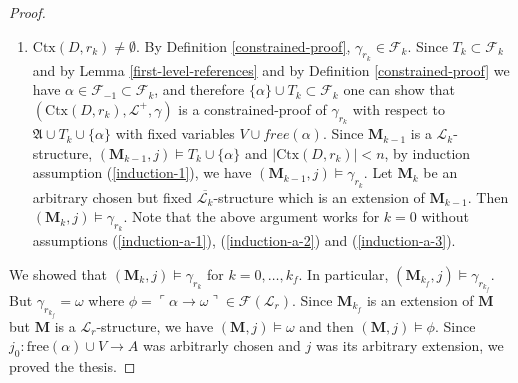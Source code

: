 \documentclass[10pt]{article}
\theoremstyle{plain}
\newcommand{\free}{\text{free}}
\newcommand{\sk}{\mathfrak{s}}
\newcommand{\F}{\mathcal{F}}
\newcommand{\context}{\text{Ctx}}
\renewcommand{\L}{\mathscr{L}}
\newcommand{\M}{\mathbf{M}}
\begin{document}
\begin{proof}
\begin{enumerate}
\begin{enumerate}
$$
\beta^{\M_{k-1}}\bigg((\sk^m_{r_k})^{\M_{k}}(j(x_1), \dots, j(x_n)), j(x_1), \dots, j(x_n), j_0(y_1), \dots, j_0(y_m)\bigg).
$$

Since $j$ is an extension of $j_0$, we have:

$$
\beta^{\M_{k-1}}\bigg((\sk^m_{r_k})^{\M_{k}}(j(x_1), \dots, j(x_n)), j(x_1), \dots, j(x_n), j(y_1), \dots, j(y_m)\bigg).
$$

Therefore $(\M_k, j\cfrac{(\sk^m_{r_k})^{(\M_{k}, j)}}{x})\models \beta$ and since $\beta(x/\sk^m_\rho)$ is admissible, by Theorem \ref{admissible-theorem}, we have $(\M_k, j)\models \beta(x/\sk^m_{r_k})$, which is the same as $(\M_k,j)\models \gamma_{r_k}$.

\end{enumerate}
Note that the all above cases work for $k = 0$ without assumptions (\ref{induction-a-1}), (\ref{induction-a-2}) and (\ref{induction-a-3}). 

\item $\context(D, r_k) \not= \emptyset$.
By Definition \ref{constrained-proof}, $\gamma_{r_k}\in \F_k$.
Since $T_k\subset\F_k$ and by Lemma \ref{first-level-references} and by Definition \ref{constrained-proof} we have $\alpha\in \F_{-1}\subset \F_k$, and therefore $\{\alpha\} \cup T_k \subset \F_k$
one can show that $(\context(D, r_k), \L^+, \gamma)$ is a constrained-proof of $\gamma_{r_k}$ with respect to $\mathfrak{A}\cup T_k \cup\{\alpha\}$ with fixed variables $V \cup free(\alpha)$. Since $\M_{k-1}$ is a $\L_k$-structure, $(\M_{k-1},j)\models T_k \cup\{\alpha\}$ and $|\context(D, r_k)| < n$, by induction assumption (\ref{induction-1}), we have $(\M_{k-1}, j)\models\gamma_{r_k}$.
Let $\M_k$ be an arbitrary chosen but fixed $\overline{\L_k}$-structure which is an extension of $\M_{k-1}$. Then $(\M_k, j)\models\gamma_{r_k}$.
Note that the above argument works for $k = 0$ without assumptions (\ref{induction-a-1}), (\ref{induction-a-2}) and (\ref{induction-a-3}). 
\end{enumerate}

We showed that $(\M_k, j)\models\gamma_{r_k}$ for $k=0, \dots, k_f$.
In particular, $(\M_{k_f}, j)\models\gamma_{r_{k_f}}$.
But $\gamma_{r_{k_f}} = \omega$ where 
$\phi = \ulcorner \alpha\to\omega \urcorner \in \F(\L_r)$. Since $\M_{k_f}$ is an extension of $\M$ but $\M$ is a $\L_r$-structure, we have $(\M, j)\models\omega$ and then $(\M, j)\models\phi$. Since $j_0:\free(\alpha)\cup V\to A$ was arbitrarly chosen and $j$ was its arbitrary extension, we proved the thesis.
\end{proof}
\end{document}
